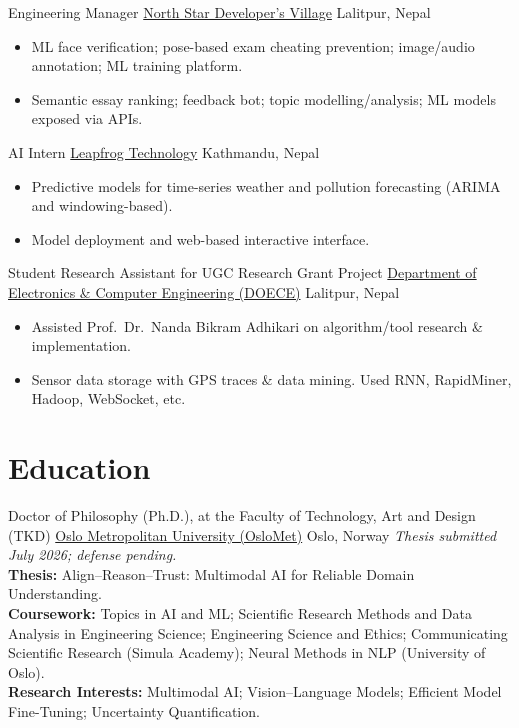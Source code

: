 \documentclass[11pt,a4paper,sans]{moderncv}
\begin{document}
        {Engineering Manager}
        {\href{https://www.nsdevil.com/?lang=en}{North Star Developer's Village}}
        {Lalitpur, Nepal}
        {}
        {%
          \begin{itemize}
            \item ML face verification; pose-based exam cheating prevention; image/audio annotation; ML training platform.
            \item Semantic essay ranking; feedback bot; topic modelling/analysis; ML models exposed via APIs.
          \end{itemize}
        }

        {AI Intern}
        {\href{https://www.lftechnology.com/}{Leapfrog Technology}}
        {Kathmandu, Nepal}
        {}
        {%
          \begin{itemize}
            \item Predictive models for time-series weather and pollution forecasting (ARIMA and windowing-based).
            \item Model deployment and web-based interactive interface.
          \end{itemize}
        }

        {Student Research Assistant for UGC Research Grant Project}
        {\href{http://doece.pcampus.edu.np/}{Department of Electronics \& Computer Engineering (DOECE)}}
        {Lalitpur, Nepal}
        {}
        {%
          \begin{itemize}
            \item Assisted Prof.\ Dr.\ Nanda Bikram Adhikari on algorithm/tool research \& implementation.
            \item Sensor data storage with GPS traces \& data mining. Used RNN, RapidMiner, Hadoop, WebSocket, etc.
          \end{itemize}
        }


\section{Education}


        {Doctor of Philosophy (Ph.D.), at the Faculty of Technology, Art and Design (TKD)}
        {{\href{https://www.oslomet.no/en}{Oslo Metropolitan University (OsloMet)}}}
        {Oslo, Norway}
        {}
        {%
          \textit{Thesis submitted July 2026; defense pending.}\\
          \textbf{Thesis:} Align--Reason--Trust: Multimodal AI for Reliable Domain Understanding.\\
          \textbf{Coursework:} Topics in AI and ML;  Scientific Research Methods and Data Analysis in Engineering Science; Engineering Science and Ethics; Communicating Scientific Research (Simula Academy); Neural Methods in NLP (University of Oslo).\\
          \textbf{Research Interests:} Multimodal AI; Vision–Language Models; Efficient Model Fine-Tuning; Uncertainty Quantification.
        }
\end{document}
